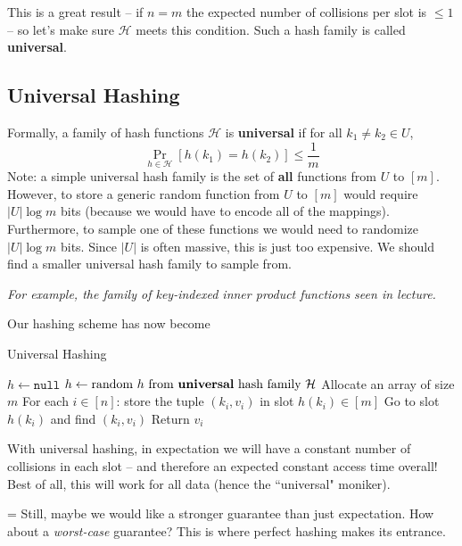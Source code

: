 \documentclass[11pt]{article}
\begin{document}
This is a great result -- if $n = m$ the expected number of collisions per slot is $\leq 1$ -- so let's make sure $\mathcal{H}$ meets this condition. Such a hash family is called \textbf{universal}.

\subsection*{Universal Hashing}

Formally, a family of hash functions $\mathcal{H}$ is \textbf{universal} if for all $k_1 \neq k_2 \in U$,
$$\Pr_{h \in \mathcal{H}}[h(k_1) = h(k_2)] \leq \frac{1}{m}$$
Note: a simple universal hash family is the set of \textbf{all} functions from $U$ to $[m]$. However, to store a generic random function from $U$ to $[m]$ would require $|U| \log m$ bits (because we would have to encode all of the mappings). Furthermore, to sample one of these functions we would need to randomize $|U| \log m$ bits. Since $|U|$ is often massive, this is just too expensive. We should find a smaller universal hash family to sample from.

\begin{flushright}
\textit{For example, the family of key-indexed inner product functions seen in lecture.}
\end{flushright}

Our hashing scheme has now become

\begin{algorithm}
\caption{Universal Hashing}
\begin{algorithmic}[1]
\State $h \gets \texttt{null}$
\State $h \gets \text{random $h$ from \textbf{universal} hash family $\mathcal{H}$}$
\State Allocate an array of size $m$
\State For each $i \in [n]$: store the tuple $(k_i, v_i)$ in slot $h(k_i) \in [m]$
\EndProcedure
{}
\State Go to slot $h(k_i)$ and find $(k_i, v_i)$
\State Return $v_i$
\EndProcedure
\end{algorithmic}
\end{algorithm}

With universal hashing, in expectation we will have a constant number of collisions in each slot -- and therefore an expected constant access time overall! Best of all, this will work for all data (hence the ``universal" moniker).

{\parskip=\baselineskip
Still, maybe we would like a stronger guarantee than just expectation. How about a \textit{worst-case} guarantee? This is where perfect hashing makes its entrance.
}
\end{document}
